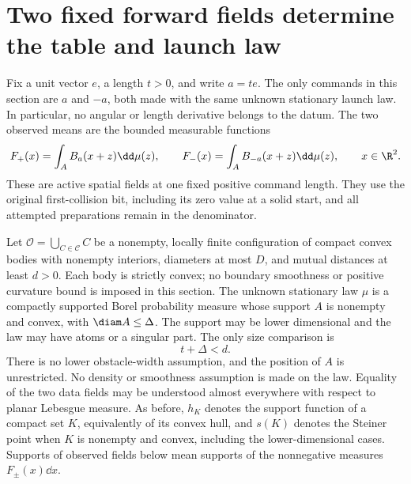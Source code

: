 \section{Two fixed forward fields determine the table and launch law}
\label{sec:two-field-rigidity}
Fix a unit vector $e$, a length $t>0$, and write $a=te$.
The only commands in this section are $a$ and $-a$, both made with
the same unknown stationary launch law.  In particular, no angular
or length derivative belongs to the datum.  The two observed means
are the bounded measurable functions
\begin{equation}\label{eq:two-field-data}
 F_+(x)=\int_A B_a(x+z)\dd\mu(z),
 \qquad
 F_-(x)=\int_A B_{-a}(x+z)\dd\mu(z),
 \qquad x\in\R^2.
\end{equation}
These are active spatial fields at one fixed positive command
length.  They use the original first-collision bit, including its
zero value at a solid start, and all attempted preparations remain
in the denominator.

Let $\mathcal O=\bigcup_{C\in\mathcal C}C$ be a nonempty, locally
finite configuration of compact convex bodies with nonempty
interiors, diameters at most $D$, and mutual distances at least
$d>0$.  Each body is strictly convex; no boundary smoothness or
positive curvature bound is imposed in this section.
The unknown stationary law $\mu$ is a compactly supported Borel
probability measure whose support $A$ is nonempty and convex, with
$\diam A\le\Delta$.  The support may be lower dimensional and the
law may have atoms or a singular part.
The only size comparison is
\begin{equation}\label{eq:two-field-gap}
                         t+\Delta<d.
\end{equation}
There is no lower obstacle-width assumption, and the position of
$A$ is unrestricted.  No density or smoothness assumption is made
on the law.  Equality of the two data fields may be understood
almost everywhere with respect to planar Lebesgue measure.
As before, $h_K$ denotes the support function of a
compact set $K$, equivalently of its convex hull, and $s(K)$ denotes
the Steiner point when $K$ is nonempty and convex, including the
lower-dimensional cases.  Supports of observed fields below mean
supports of the nonnegative measures $F_\pm(x)\dd x$.


